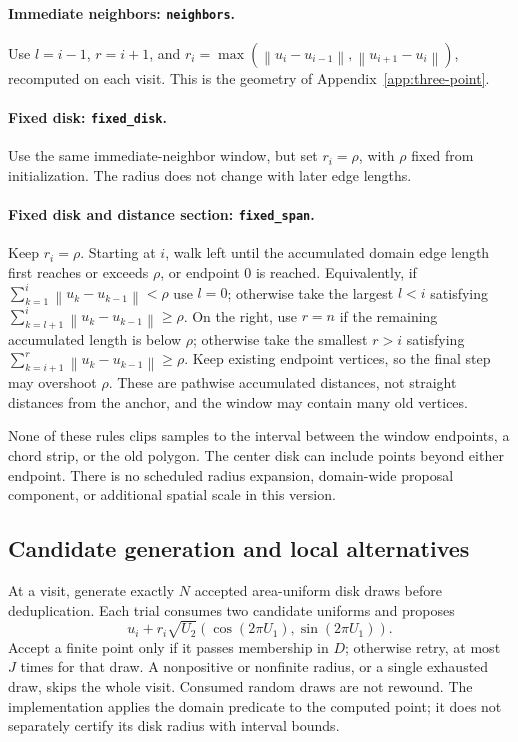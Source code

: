 \documentclass[11pt,letterpaper]{article}
\newcommand{\norm}[1]{\left\lVert#1\right\rVert}
\newcommand{\src}[1]{\nolinkurl{#1}}
\begin{document}
\paragraph{Immediate neighbors: \src{neighbors}.}
Use $l=i-1$, $r=i+1$, and
$r_i=\max(\norm{u_i-u_{i-1}},\norm{u_{i+1}-u_i})$, recomputed on each visit.
This is the geometry of Appendix~\ref{app:three-point}.

\paragraph{Fixed disk: \src{fixed_disk}.}
Use the same immediate-neighbor window, but set $r_i=\rho$, with $\rho$
fixed from initialization. The radius does not change with later edge lengths.

\paragraph{Fixed disk and distance section: \src{fixed_span}.}
Keep $r_i=\rho$. Starting at $i$, walk left until the accumulated domain
edge length first reaches or exceeds $\rho$, or endpoint 0 is reached.
Equivalently, if $\sum_{k=1}^{i}\norm{u_k-u_{k-1}}<\rho$ use $l=0$;
otherwise take the largest $l<i$ satisfying
$\sum_{k=l+1}^{i}\norm{u_k-u_{k-1}}\ge\rho$.
On the right, use $r=n$ if the remaining accumulated length is below $\rho$;
otherwise take the smallest $r>i$ satisfying
$\sum_{k=i+1}^{r}\norm{u_k-u_{k-1}}\ge\rho$.
Keep existing endpoint vertices, so the final step may overshoot $\rho$.
These are pathwise accumulated distances, not straight distances from the
anchor, and the window may contain many old vertices.

None of these rules clips samples to the interval between the window
endpoints, a chord strip, or the old polygon. The center disk can include
points beyond either endpoint. There is no scheduled radius expansion,
domain-wide proposal component, or additional spatial scale in this version.

\subsection{Candidate generation and local alternatives}
\label{sec:cpp-alternatives}

At a visit, generate exactly $N$ accepted area-uniform disk draws before
deduplication. Each trial consumes two candidate uniforms and proposes
\[
 u_i+r_i\sqrt{U_2}(\cos(2\pi U_1),\sin(2\pi U_1)).
\]
Accept a finite point only if it passes membership in $D$; otherwise retry,
at most $J$ times for that draw. A nonpositive or nonfinite radius, or a
single exhausted draw, skips the whole visit. Consumed random draws are not
rewound. The implementation applies the domain predicate to the computed
point; it does not separately certify its disk radius with interval bounds.
\end{document}
